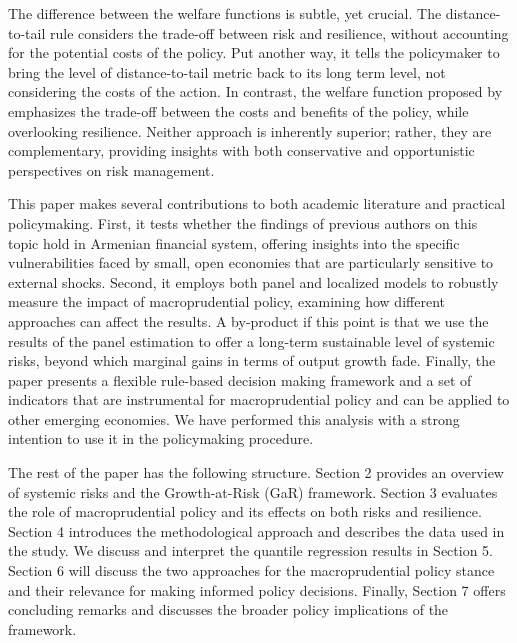 The difference between the welfare functions is subtle, yet crucial. The distance-to-tail rule considers the trade-off between risk and resilience, without accounting for the potential costs of the policy. Put another way, it tells the policymaker to bring the level of distance-to-tail metric back to its long term level, not considering the costs of the action. In contrast, the welfare function proposed by \citet{suarez2022} emphasizes the trade-off between the costs and benefits of the policy, while overlooking resilience. Neither approach is inherently superior; rather, they are complementary, providing insights with both conservative and opportunistic perspectives on risk management.

This paper makes several contributions to both academic literature and practical policymaking. First, it tests whether the findings of previous authors on this topic hold in Armenian financial system, offering insights into the specific vulnerabilities faced by small, open economies that are particularly sensitive to external shocks. Second, it employs both panel and localized models to robustly measure the impact of macroprudential policy, examining how different approaches can affect the results. A by-product if this point is that we use the results of the panel estimation to offer a long-term sustainable level of systemic risks, beyond which marginal gains in terms of output growth fade. Finally, the paper presents a flexible rule-based decision making framework and a set of indicators that are instrumental for macroprudential policy and can be applied to other emerging economies. We have performed this analysis with a strong intention to use it in the policymaking procedure.

The rest of the paper has the following structure. Section 2 provides an overview of systemic risks and the Growth-at-Risk (GaR) framework. Section 3 evaluates the role of macroprudential policy and its effects on both risks and resilience. Section 4 introduces the methodological approach and describes the data used in the study. We discuss and interpret the quantile regression results in Section 5. Section 6 will discuss the two approaches for the macroprudential policy stance and their relevance for making informed policy decisions. Finally, Section 7 offers concluding remarks and discusses the broader policy implications of the framework.
